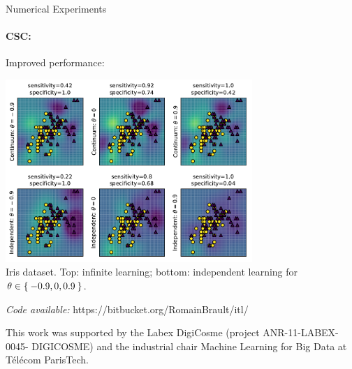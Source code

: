 \begin{poster}
\begin{posterbox}[name=numerical_ex,below=excess_risk, bottomaligned=vv-rkhs,column=1]{Numerical Experiments}
  \paragraph{\ac{CSC}:} Improved performance:
  \begin{center}
      \includegraphics[width=0.7\textwidth]{fig/icsl_vs.pdf}\\
      Iris dataset. Top: infinite learning; bottom: independent learning
      for $\theta\in\Set{-0.9, 0, 0.9}$.\\
  \end{center}\par
  \begin{center}
    \emph{Code available:} https://bitbucket.org/RomainBrault/itl/
  \end{center}
\end{posterbox}
\begin{posterbox}[name=references, column=0,span=2,
                  headerColorOne=white,below=vv-rkhs
                  ]{\footnotesize{\normalfont This work was supported by the Labex DigiCosme (project ANR-11-LABEX-0045-
DIGICOSME) and the industrial chair Machine Learning for Big Data at T{\'e}l{\'e}com ParisTech.}}
\neutralisetitre

{\footnotesize{}
\vspace{-2mm}
\begin{thebibliography}{1}




\end{thebibliography}}
\end{posterbox}
\end{poster}
